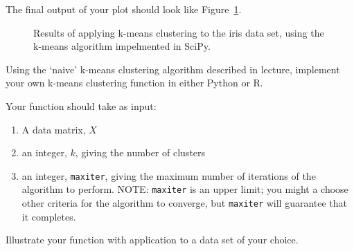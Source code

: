 The final output of your plot should look like Figure~\ref{fig:pykmeans}.

\begin{figure}[ht!]
  \caption{Results of applying k-means clustering to the iris data set, using the k-means algorithm impelmented in SciPy.\label{fig:pykmeans}}
\end{figure}


\medskip
\begin{assignment}
\small

Using the `naive' k-means clustering algorithm described in lecture, implement your own k-means clustering function in either Python or R.

Your function should take as input:
\begin{enumerate}
\item A data matrix, $X$
\item an integer, $k$, giving the number of clusters
\item an integer, \verb|maxiter|, giving the maximum number of iterations of the algorithm to perform. NOTE: \verb|maxiter| is an upper limit; you might a choose other criteria for the algorithm to converge, but \verb|maxiter| will guarantee that it completes.
\end{enumerate}

Illustrate your function with application to a data set of your choice.


\end{assignment}



